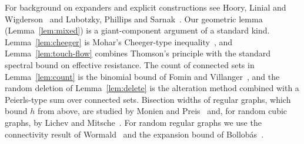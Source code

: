 For background on expanders and explicit constructions see Hoory, Linial and Wigderson~\cite{HLW06} and Lubotzky, Phillips and Sarnak~\cite{LPS88}. Our geometric lemma (Lemma~\ref{lem:mixed}) is a giant-component argument of a standard kind. Lemma~\ref{lem:cheeger} is Mohar's Cheeger-type inequality~\cite{Mohar89}, and Lemma~\ref{lem:touch-flow} combines Thomson's principle with the standard spectral bound on effective resistance. The count of connected sets in Lemma~\ref{lem:count} is the binomial bound of Fomin and Villanger~\cite{FominVillanger12}, and the random deletion of Lemma~\ref{lem:delete} is the alteration method combined with a Peierls-type sum over connected sets. Bisection widths of regular graphs, which bound $h$ from above, are studied by Monien and Preis~\cite{MoniePreis06} and, for random cubic graphs, by Lichev and Mitsche~\cite{LichevMitsche23}. For random regular graphs we use the connectivity result of Wormald~\cite{Wormald81} and the expansion bound of Bollob\'as~\cite{Bollobas88}.
